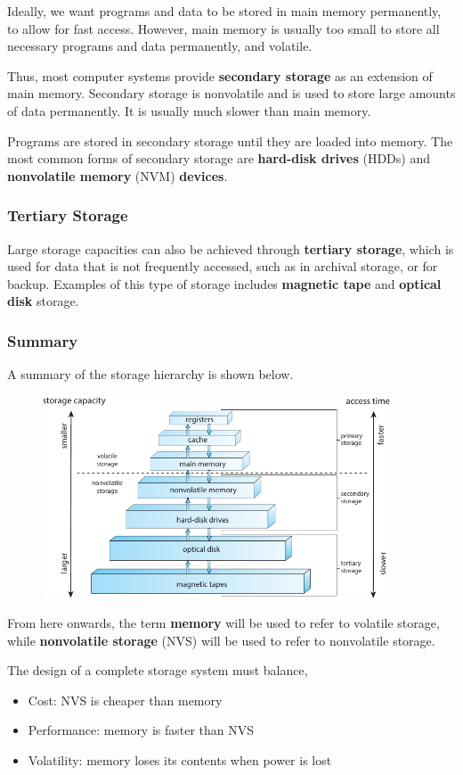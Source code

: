 \documentclass{article}
\begin{document}
Ideally, we want programs and data to be stored in main memory
permanently, to allow for fast access. However, main memory is usually
too small to store all necessary programs and data permanently, and
volatile.

Thus, most computer systems provide \textbf{secondary storage} as an
extension of main memory. Secondary storage is nonvolatile and is used
to store large amounts of data permanently. It is usually much slower
than main memory.

Programs are stored in secondary storage until they are loaded into
memory. The most common forms of secondary storage are
\textbf{hard-disk drives} (HDDs) and \textbf{nonvolatile memory} (NVM)
\textbf{devices}.
\subsubsection{Tertiary Storage}
Large storage capacities can also be achieved through \textbf{tertiary
storage}, which is used for data that is not frequently accessed, such
as in archival storage, or for backup. Examples of this type of storage
includes \textbf{magnetic tape} and \textbf{optical disk} storage.
\subsubsection{Summary}
A summary of the storage hierarchy is shown below.
\begin{figure}[H]
    \centering
    \includegraphics[height = 6cm]{figures/storage_hierarchy.pdf}
\end{figure}
From here onwards, the term \textbf{memory} will be used to refer to
volatile storage, while \textbf{nonvolatile storage} (NVS) will be
used to refer to nonvolatile storage.

The design of a complete storage system must balance,
\begin{itemize}
    \item Cost: NVS is cheaper than memory
    \item Performance: memory is faster than NVS
    \item Volatility: memory loses its contents when power is lost
\end{itemize}
\end{document}
